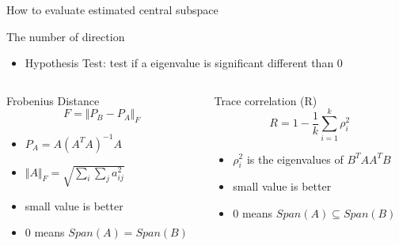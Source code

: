 \documentclass[ignorenonframetext,]{beamer}
\begin{document}
\begin{frame}{How to evaluate estimated central subspace}

\begin{block}{The number of direction}
\begin{itemize}
\item Hypothesis Test: test if a eigenvalue is significant different than 0
\end{itemize}
\end{block}

\begin{columns}
\begin{column}{0.5\textwidth}
   \begin{block}{Frobenius Distance}
    \[
      F = \Vert P_B - P_A\Vert_F
    \]
    \begin{itemize}
    \item $P_A = A(A^TA)^{-1}A$
    \item $\Vert A\Vert_F = \sqrt{\sum_i\sum_j a^2_{ij}}$
    \item small value is better 
    \item 0 means $Span(A) = Span(B)$
    \end{itemize}
    
   \end{block}
\end{column}
\begin{column}{0.5\textwidth}  %
    \begin{block}{Trace correlation (R)}
    \[
    R = 1 - \frac{1}{k}\sum_{i=1}^k\rho_i^2
    \]
    \begin{itemize}
      \item $\rho_i^2$ is the eigenvalues of $B^TAA^TB$
      \item small value is better
      \item 0 means $Span(A) \subseteq Span(B)$
    \end{itemize}
    \end{block}
\end{column}
\end{columns}

\end{frame}
\end{document}
